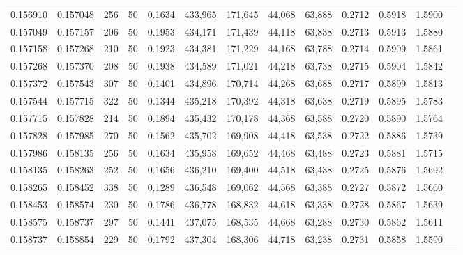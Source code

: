 \begin{tabular}{rrrrrrrrrrrrr}
0.156910 & 0.157048 &   256 &  50 &                                     0.1634 & 433,965 & 171,645 &  44,068 &  63,888 & 0.2712 & 0.5918 & 1.5900 \\
0.157049 & 0.157157 &   206 &  50 &                                     0.1953 & 434,171 & 171,439 &  44,118 &  63,838 & 0.2713 & 0.5913 & 1.5880 \\
0.157158 & 0.157268 &   210 &  50 &                                     0.1923 & 434,381 & 171,229 &  44,168 &  63,788 & 0.2714 & 0.5909 & 1.5861 \\
0.157268 & 0.157370 &   208 &  50 &                                     0.1938 & 434,589 & 171,021 &  44,218 &  63,738 & 0.2715 & 0.5904 & 1.5842 \\
0.157372 & 0.157543 &   307 &  50 &                                     0.1401 & 434,896 & 170,714 &  44,268 &  63,688 & 0.2717 & 0.5899 & 1.5813 \\
0.157544 & 0.157715 &   322 &  50 &                                     0.1344 & 435,218 & 170,392 &  44,318 &  63,638 & 0.2719 & 0.5895 & 1.5783 \\
0.157715 & 0.157828 &   214 &  50 &                                     0.1894 & 435,432 & 170,178 &  44,368 &  63,588 & 0.2720 & 0.5890 & 1.5764 \\
0.157828 & 0.157985 &   270 &  50 &                                     0.1562 & 435,702 & 169,908 &  44,418 &  63,538 & 0.2722 & 0.5886 & 1.5739 \\
0.157986 & 0.158135 &   256 &  50 &                                     0.1634 & 435,958 & 169,652 &  44,468 &  63,488 & 0.2723 & 0.5881 & 1.5715 \\
0.158135 & 0.158263 &   252 &  50 &                                     0.1656 & 436,210 & 169,400 &  44,518 &  63,438 & 0.2725 & 0.5876 & 1.5692 \\
0.158265 & 0.158452 &   338 &  50 &                                     0.1289 & 436,548 & 169,062 &  44,568 &  63,388 & 0.2727 & 0.5872 & 1.5660 \\
0.158453 & 0.158574 &   230 &  50 &                                     0.1786 & 436,778 & 168,832 &  44,618 &  63,338 & 0.2728 & 0.5867 & 1.5639 \\
0.158575 & 0.158737 &   297 &  50 &                                     0.1441 & 437,075 & 168,535 &  44,668 &  63,288 & 0.2730 & 0.5862 & 1.5611 \\
0.158737 & 0.158854 &   229 &  50 &                                     0.1792 & 437,304 & 168,306 &  44,718 &  63,238 & 0.2731 & 0.5858 & 1.5590 \\

\end{tabular}
